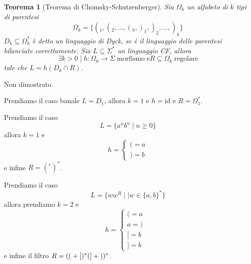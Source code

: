 \documentclass[12pt]{report}
\newtheorem{teorema}{Teorema}
\theoremstyle{definition}
\begin{document}
\begin{teorema}[Teorema di Chomsky-Schutzenberger]	%
	Sia $\Omega_k$ un alfabeto di $k$ tipi di parentesi
	$$ \Omega_k = \{ (_1, (_2, \dots, (_k, )_1, )_2, \dots, )_k \} $$
	$D_k \subseteq \Omega_k^*$ è detto un linguaggio di Dyck, se è il linguaggio delle parentesi bilanciate correttamente.
	Sia $L \subseteq \Sigma^*$ un linguaggio CF, allora 
	$$ \exists k > 0 \mid h : \Omega_k \rightarrow \Sigma \; \text{morfismo} \; \text{e} R \subseteq \Omega_k \; \text{regolare} $$
	tale che $L = h(D_k \cap R)$.
\end{teorema}
Non dimostrato.

\begin{tcolorbox}[breakable]
	Prendiamo il caso banale $L = D_1$, allora $k = 1$ e $h = \text{id}$ e $R = \Omega_1^*$.
\end{tcolorbox}
\begin{tcolorbox}[breakable]
	Prendiamo il caso 
	$$L = \{ a^n b^n \mid n \geq 0 \} $$
	allora $k = 1$ e 
	$$ h = \begin{cases} ( = a \\ ) = b \end{cases} $$ 
	e infine $R = (^* )^*$.
\end{tcolorbox}

\begin{tcolorbox}[breakable]
	Prendiamo il caso 
	$$L = \{ w w^R \mid \mid w \in \{a, b\}^* \} $$
	allora prendiamo $k = 2$ e 
	$$ h = \begin{cases} ( = a & \\ a = ) \\ [ = b \\ ] = b \end{cases} $$ 
	e infine il filtro $R = (\text{\texttt{$($}} + \text{\texttt{$[$}})^* (\text{\texttt{$]$}} + \text{\texttt{$)$}})^*$.
\end{tcolorbox}
\end{document}
